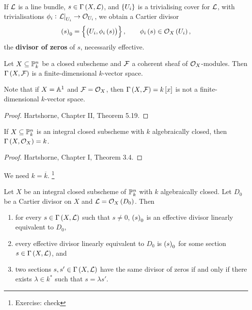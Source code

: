 If $ \LLL $ is a line bundle, $ s \in \Gamma\br{X, \LLL} $, and $ \cbr{U_i} $ is a trivialising cover for $ \LLL $, with trivialisations $ \phi_i : \eval{\LLL}_{U_i} \to \OOO_{U_i} $, we obtain a Cartier divisor
$$ \br{s}_0 = \cbr{\br{U_i, \phi_i\br{s}}}, \qquad \phi_i\br{s} \in \OOO_X\br{U_i}, $$
the \textbf{divisor of zeros} of $ s $, necessarily effective.

\pagebreak


\begin{theorem}
Let $ X \subseteq \PP_k^n $ be a closed subscheme and $ \FFF $ a coherent sheaf of $ \OOO_X $-modules. Then $ \Gamma\br{X, \FFF} $ is a finite-dimensional $ k $-vector space.
\end{theorem}

Note that if $ X = \AA^1 $ and $ \FFF = \OOO_X $, then $ \Gamma\br{X, \FFF} = k\sbr{x} $ is not a finite-dimensional $ k $-vector space.

\begin{proof}
Hartshorne, Chapter II, Theorem 5.19.
\end{proof}

\begin{theorem}
If $ X \subseteq \PP_k^n $ is an integral closed subscheme with $ k $ algebraically closed, then $ \Gamma\br{X, \OOO_X} = k $.
\end{theorem}

\begin{proof}
Hartshorne, Chapter I, Theorem 3.4.
\end{proof}

We need $ k = \overline{k} $. \footnote{Exercise: check}

\begin{theorem}
\label{thm:effectivedivisor}
Let $ X $ be an integral closed subscheme of $ \PP_k^n $ with $ k $ algebraically closed. Let $ D_0 $ be a Cartier divisor on $ X $ and $ \LLL = \OOO_X\br{D_0} $. Then
\begin{enumerate}
\item for every $ s \in \Gamma\br{X, \LLL} $ such that $ s \ne 0 $, $ \br{s}_0 $ is an effective divisor linearly equivalent to $ D_0 $,
\item every effective divisor linearly equivalent to $ D_0 $ is $ \br{s}_0 $ for some section $ s \in \Gamma\br{X, \LLL} $, and
\item two sections $ s, s' \in \Gamma\br{X, \LLL} $ have the same divisor of zeros if and only if there exists $ \lambda \in k^* $ such that $ s = \lambda s' $.
\end{enumerate}
\end{theorem}

